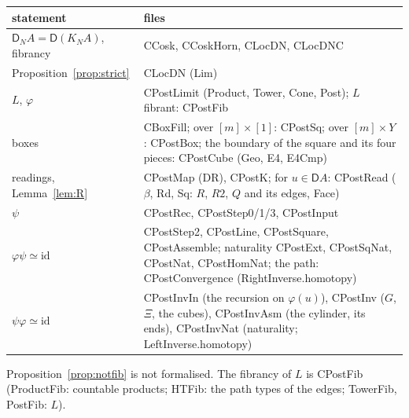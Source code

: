 \documentclass[11pt]{article}
\newcommand{\id}{\mathrm{id}}
\newcommand{\D}{\mathsf{D}}
\theoremstyle{plain}
\theoremstyle{definition}
\theoremstyle{remark}
\begin{document}
\medskip
\begin{tabular}{p{4.3cm}p{9.6cm}}
statement & files\\\hline
$\D_NA=\D(K_NA)$, fibrancy & CCosk, CCoskHorn, CLocDN, CLocDNC\\
Proposition~\ref{prop:strict} & CLocDN (Lim)\\
$L$, $\varphi$ & CPostLimit (Product, Tower, Cone, Post); $L$ fibrant: CPostFib\\
boxes & CBoxFill; over $[m]\times[1]$: CPostSq; over $[m]\times Y$: CPostBox; the
boundary of the square and its four pieces: CPostCube (Geo, E4, E4Cmp)\\
readings, Lemma~\ref{lem:R} & CPostMap (DR), CPostK; for $u\in\D A$:
CPostRead ($\beta$, Rd, Sq: $R$, $R2$, $Q$ and its edges, Face)\\
$\psi$ & CPostRec, CPostStep0/1/3, CPostInput\\
$\varphi\psi\simeq\id$ & CPostStep2, CPostLine, CPostSquare, CPostAssemble;
naturality CPostExt, CPostSqNat, CPostNat, CPostHomNat; the path:
CPostConvergence (RightInverse.homotopy)\\
$\psi\varphi\simeq\id$ & CPostInvIn (the recursion on $\varphi(u)$), CPostInv
($G$, $\Xi$, the cubes), CPostInvAsm (the cylinder, its ends), CPostInvNat
(naturality; LeftInverse.homotopy)
\end{tabular}

\medskip
Proposition~\ref{prop:notfib} is not formalised. The fibrancy of $L$ is
CPostFib (ProductFib: countable products; HTFib: the path types of the
edges; TowerFib, PostFib: $L$).
\end{document}
